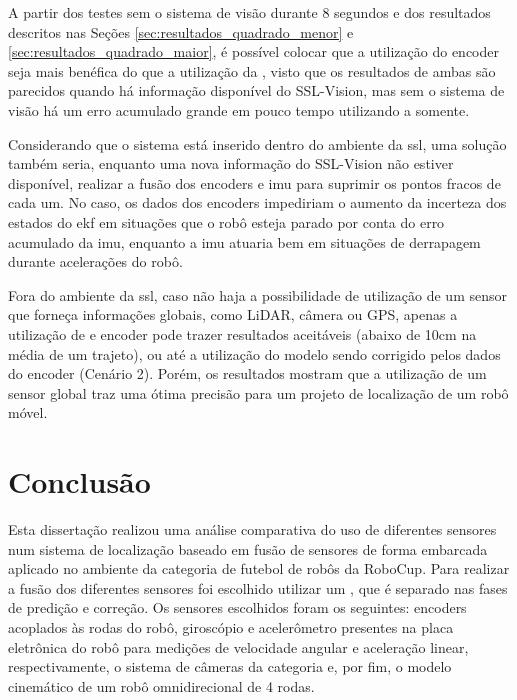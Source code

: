 \documentclass[acronym, symbols, table, deposito]{fei}
\begin{document}
		A partir dos testes sem o sistema de visão durante 8 segundos e dos resultados descritos nas Seções \ref{sec:resultados_quadrado_menor} e \ref{sec:resultados_quadrado_maior}, é possível colocar que a utilização do encoder seja mais benéfica do que a utilização da , visto que os resultados de ambas são parecidos quando há informação disponível do SSL-Vision, mas sem o sistema de visão há um erro acumulado grande em pouco tempo utilizando a  somente. 
		
		Considerando que o sistema está inserido dentro do ambiente da \acrshort{ssl}, uma solução também seria, enquanto uma nova informação do SSL-Vision não estiver disponível, realizar a fusão dos encoders e \acrshort{imu} para suprimir os pontos fracos de cada um. No caso, os dados dos encoders impediriam o aumento da incerteza dos estados do \acrshort{ekf} em situações que o robô esteja parado por conta do erro acumulado da \acrshort{imu}, enquanto a \acrshort{imu} atuaria bem em situações de derrapagem durante acelerações do robô.
		
		
		Fora do ambiente da \acrshort{ssl}, caso não haja a possibilidade de utilização de um sensor que forneça informações globais, como LiDAR, câmera ou GPS, apenas a utilização de  e encoder pode trazer resultados aceitáveis (abaixo de 10cm na média de um trajeto), ou até a utilização do modelo sendo corrigido pelos dados do encoder (Cenário 2). Porém, os resultados mostram que a utilização de um sensor global traz uma ótima precisão para um projeto de localização de um robô móvel.

\chapter{Conclusão} \label{sec:conclusao}

	Esta dissertação realizou uma análise comparativa do uso de diferentes sensores num sistema de localização baseado em fusão de sensores de forma embarcada aplicado no ambiente da categoria  de futebol de robôs da RoboCup. Para realizar a fusão dos diferentes sensores foi escolhido utilizar um , que é separado nas fases de predição e correção. Os sensores escolhidos foram os seguintes: encoders acoplados às rodas do robô, giroscópio e acelerômetro presentes na placa eletrônica do robô para medições de velocidade angular e aceleração linear, respectivamente, o sistema de câmeras da categoria  e, por fim, o modelo cinemático de um robô omnidirecional de 4 rodas.
	
\end{document}
